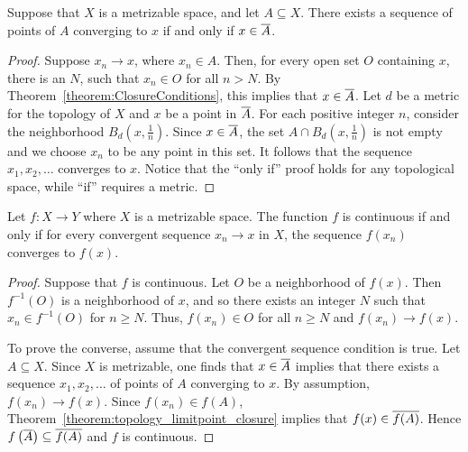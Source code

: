 \begin{theorem}
Suppose that $X$ is a metrizable space, and let $A \subseteq X$.
There exists a sequence of points of $A$ converging to $x$ if and only if $x \in \overline{A}$.
\end{theorem}
\begin{proof}
Suppose $x_n \rightarrow x$, where $x_n \in A$.
Then, for every open set $O$ containing $x$, there is an $N$, such that $x_n \in O$ for all $n>N$.
By Theorem~\ref{theorem:ClosureConditions}, this implies that $x \in \overline{A}$.
Let $d$ be a metric for the topology of $X$ and $x$ be a point in $\overline{A}$.
For each positive integer $n$, consider the neighborhood $B_d \left( x, \frac{1}{n} \right)$.
Since $x\in \overline{A}$, the set $A \cap B_d \left( x, \frac{1}{n} \right)$ is not empty and we choose $x_n$ to be any point in this set.
It follows that the sequence $x_1, x_2, \ldots$ converges to $x$.
Notice that the ``only if'' proof holds for any topological space, while ``if'' requires a metric.
\end{proof}

\begin{theorem}
\label{theorem:topology_limitpoint_closure}
Let $f \colon X \rightarrow Y$ where $X$ is a metrizable space.
The function $f$ is continuous if and only if for every convergent sequence $x_n \rightarrow x$ in $X$, the sequence $f(x_n)$ converges to $f(x)$.
\end{theorem}
\begin{proof}
Suppose that $f$ is continuous.
Let $O$ be a neighborhood of $f(x)$.
Then $f^{-1}(O)$ is a neighborhood of $x$, and so there exists an integer $N$ such that $x_n \in f^{-1}(O)$ for $n \geq N$.
Thus, $f(x_n) \in O$ for all $n \geq N$ and $f(x_n) \rightarrow f(x)$.

To prove the converse, assume that the convergent sequence condition is true.
Let $A \subseteq X$.
Since $X$ is metrizable, one finds that $x \in \overline{A}$ implies that there exists a sequence $x_1, x_2, \ldots$ of points of $A$ converging to $x$.
By assumption, $f(x_n) \rightarrow f(x)$.
Since $f(x_n) \in f(A)$, Theorem~\ref{theorem:topology_limitpoint_closure} implies that $f(x) \in \overline{f(A)}$.
Hence $f \left( \overline{A} \right) \subseteq \overline{f(A)}$ and $f$ is continuous.
\end{proof}

